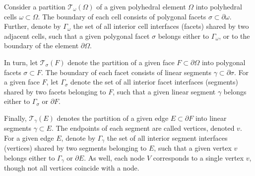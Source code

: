 	Consider a partition $\mathcal{T}_\omega (\Omega)$ of a given polyhedral element $\Omega$ into polyhedral cells $\omega \subset \Omega$. The boundary of each cell consists of polygonal facets $\sigma \subset \partial \omega$. Further, denote by $\Gamma_\omega$ the set of all interior cell interfaces (facets) shared by two adjacent cells, such that a given polygonal facet $\sigma$ belongs either to $\Gamma_\omega$, or to the boundary of the element $\partial \Omega$.
	
	In turn, let $\mathcal{T}_{\sigma} (F)$ denote the partition of a given face $F \subset \partial \Omega$ into polygonal facets $\sigma \subset F$. The boundary of each facet consists of linear segments $\gamma \subset \partial \sigma$. For a given face $F$, let $\Gamma_\sigma$ denote the set of all interior facet interfaces (segments) shared by two facets belonging to $F$, such that a given linear segment $\gamma$ belongs either to $\Gamma_\sigma$ or $\partial F$.
	
	Finally, $\mathcal{T}_{\gamma} (E)$ denotes the partition of a given edge $E \subset \partial F$ into linear segments $\gamma \subset E$. The endpoints of each segment are called vertices, denoted $v$. For a given edge $E$, denote by $\Gamma_\gamma$ the set of all interior segment interfaces (vertices) shared by two segments belonging to $E$, such that a given vertex $v$ belongs either to $\Gamma_\gamma$ or $\partial E$. As well, each node $V$ corresponds to a single vertex $v$, though not all vertices coincide with a node.
	
